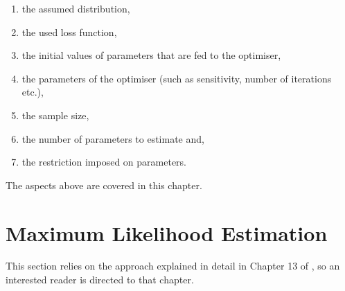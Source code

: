\documentclass[
]{book}
\providecommand{\tightlist}{%
  \setlength{\itemsep}{0pt}\setlength{\parskip}{0pt}}
\theoremstyle{definition}
\theoremstyle{definition}
\theoremstyle{definition}
\theoremstyle{definition}
\theoremstyle{remark}
\begin{document}
\begin{enumerate}
\def\labelenumi{\arabic{enumi}.}
\tightlist
\item
  the assumed distribution,
\item
  the used loss function,
\item
  the initial values of parameters that are fed to the optimiser,
\item
  the parameters of the optimiser (such as sensitivity, number of iterations etc.),
\item
  the sample size,
\item
  the number of parameters to estimate and,
\item
  the restriction imposed on parameters.
\end{enumerate}

The aspects above are covered in this chapter.

\hypertarget{ADAMETSEstimationLikelihood}{%
\section{Maximum Likelihood Estimation}\label{ADAMETSEstimationLikelihood}}

This section relies on the approach explained in detail in Chapter 13 of \citet{SvetunkovSBA}, so an interested reader is directed to that chapter.
\end{document}
